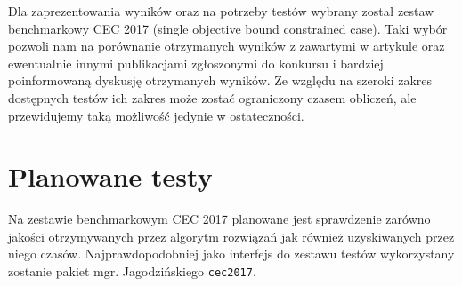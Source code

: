 Dla zaprezentowania wyników oraz na potrzeby testów wybrany został zestaw benchmarkowy CEC 2017 (single objective bound constrained case). Taki wybór pozwoli nam na porównanie otrzymanych wyników z zawartymi w artykule oraz ewentualnie innymi publikacjami zgłoszonymi do konkursu i bardziej poinformowaną dyskusję otrzymanych wyników. Ze względu na szeroki zakres dostępnych testów ich zakres może zostać ograniczony czasem obliczeń, ale przewidujemy taką możliwość jedynie w ostateczności.

\section{Planowane testy}
Na zestawie benchmarkowym CEC 2017 planowane jest sprawdzenie zarówno jakości otrzymywanych przez algorytm rozwiązań jak również uzyskiwanych przez niego czasów. Najprawdopodobniej jako interfejs do zestawu testów wykorzystany zostanie pakiet mgr. Jagodzińskiego \verb+cec2017+.

